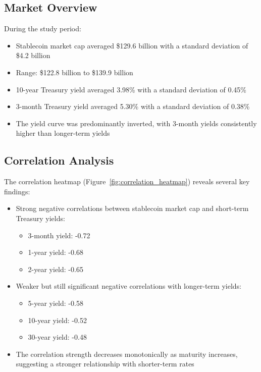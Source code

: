 \documentclass[12pt,a4paper]{article}
\begin{document}
\subsection{Market Overview}
During the study period:
\begin{itemize}
    \item Stablecoin market cap averaged \$129.6 billion with a standard deviation of \$4.2 billion
    \item Range: \$122.8 billion to \$139.9 billion
    \item 10-year Treasury yield averaged 3.98\% with a standard deviation of 0.45\%
    \item 3-month Treasury yield averaged 5.30\% with a standard deviation of 0.38\%
    \item The yield curve was predominantly inverted, with 3-month yields consistently higher than longer-term yields
\end{itemize}

\subsection{Correlation Analysis}
The correlation heatmap (Figure~\ref{fig:correlation_heatmap}) reveals several key findings:
\begin{itemize}
    \item Strong negative correlations between stablecoin market cap and short-term Treasury yields:
    \begin{itemize}
        \item 3-month yield: -0.72
        \item 1-year yield: -0.68
        \item 2-year yield: -0.65
    \end{itemize}
    \item Weaker but still significant negative correlations with longer-term yields:
    \begin{itemize}
        \item 5-year yield: -0.58
        \item 10-year yield: -0.52
        \item 30-year yield: -0.48
    \end{itemize}
    \item The correlation strength decreases monotonically as maturity increases, suggesting a stronger relationship with shorter-term rates
\end{itemize}
\end{document}
